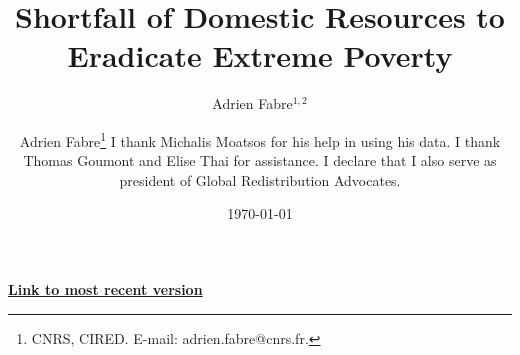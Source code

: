 

% 



% 
% 

% 


\title{Shortfall of Domestic Resources to Eradicate Extreme Poverty} 

\author{Adrien Fabre$^{1,2}$} %
\author{Adrien Fabre\footnote{CNRS, CIRED. E-mail: adrien.fabre@cnrs.fr.}
I thank Michalis Moatsos for his help in using his data. I thank Thomas Goumont and Elise Thai for assistance. I declare that I also serve as president of Global Redistribution Advocates.} %

\date{\today} %



\maketitle

\begin{center}
{\textbf{\href{https://github.com/bixiou/domestic_poverty_eradication/raw/main/paper/poverty.pdf}{Link to most recent version}}}
\end{center}


